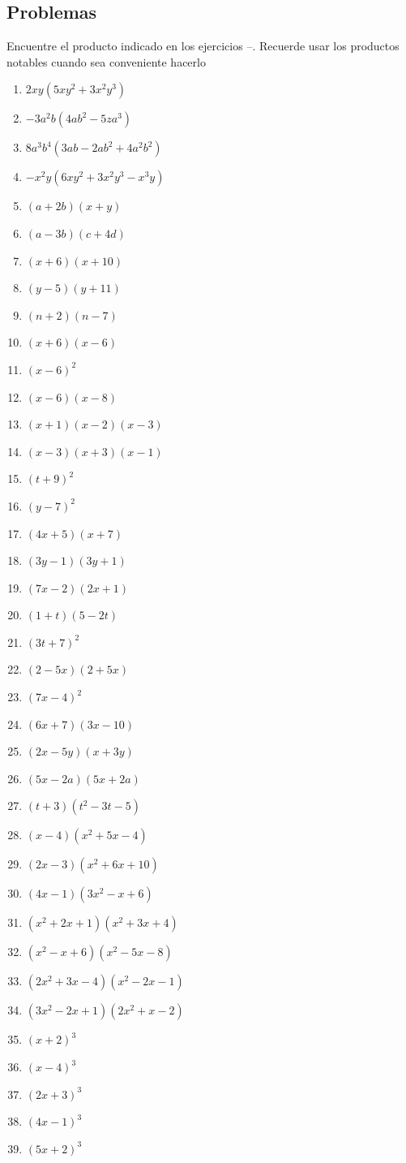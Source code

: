 \documentclass[10pt,twoside]{article}
\begin{document}
\subsection{Problemas}
Encuentre el producto indicado en los ejercicios \cite{ej01}--\cite{ej32}. Recuerde usar los productos notables cuando sea conveniente hacerlo
\begin{enumerate}
\item $2xy(5xy^2+3x^2y^3)$ \label{ej01}
\item $-3a^{2}b(4ab^{2}-5za^{3})$
\item $8a^{3}b^{4}(3ab-2ab^{2}+4a^{2}b^{2})$
\item $-x^{2}y(6xy^{2}+3x^{2}y^{3}-x^{3}y)$
\item $(a+2b)(x+y)$
\item $(a-3b)(c+4d)$
\item $(x+6)(x+10)$
\item $(y-5)(y+11)$
\item $(n+2)(n-7)$
\item $(x+6)(x-6)$
\item $(x-6)^{2}$
\item $(x-6)(x-8)$
\item $(x+1)(x-2)(x-3)$
\item $(x-3)(x+3)(x-1)$
\item $(t+9)^{2}$
\item $(y-7)^{2}$
\item $(4x+5)(x+7)$
\item $(3y-1)(3y+1)$
\item $(7x-2)(2x+1)$
\item $(1+t)(5-2t)$
\item $(3t+7)^2$
\item $(2-5x)(2+5x)$
\item $(7x-4)^2$
\item $(6x+7)(3x-10)$
\item $(2x-5y)(x+3y)$
\item $(5x-2a)(5x+2a)$
\item $(t+3)(t^2-3t-5)$
\item $(x-4)(x^2+5x-4)$
\item $(2x-3)(x^2+6x+10)$
\item $(4x-1)(3x^2-x+6)$
\item $(x^2+2x+1)(x^2+3x+4)$
\item $(x^2-x+6)(x^2-5x-8)$
\item $(2x^2+3x-4)(x^2-2x-1)$
\item $(3x^2-2x+1)(2x^2+x-2)$
\item $(x+2)^3$
\item $(x-4)^3$
\item $(2x+3)^3$
\item $(4x-1)^3$
\item $(5x+2)^3$ \label{ej32}
\end{enumerate}
\end{document}

